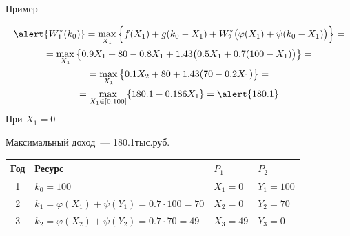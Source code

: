 \documentclass[unicode,11pt,notheorems,xcolor=table]{beamer}
\begin{document}
\begin{frame}[allowframebreaks]{Пример}
\begin{itemize}
\begin{multline*}
	\alert{W^*_1(k_{0})} = \max_{X_1} \Big\{f(X_1)+g(k_{0}-X_1) + W^*_{2} \big(\varphi(X_1)+\psi(k_{0}-X_{1})\big)\Big\}
	=\\
	=\max_{X_1} \big\{0.9X_1+80-0.8X_1 + 1.43 \big(0.5X_1+0.7(100-X_{1})\big)\big\}	
	=\\
	=\max_{X_1} \big\{0.1X_2 + 80 + 1.43(70-0.2X_{1})\big\}	
	=\\
	=\max_{X_1\in[0,100]} \{180.1-0.186X_1\}	
	= \alert{180.1}
\end{multline*}
При $X_1=0$
\end{itemize}


\alert{Максимальный доход}~--- 180.1\;тыс.\;руб.

\framebreak


\bigskip
\begin{tabular}{clll}
\hline
Год & Ресурс & $P_1$ & $P_2$\\
\hline
1 & $k_0=100$ & $X_1=0$ & $Y_1=100$\\
2 & $k_1= \varphi(X_1)+\psi(Y_1) = 0.7\cdot 100=70$ & $X_2=0$ & $Y_2=70$\\
3 & $k_2= \varphi(X_2)+\psi(Y_2) = 0.7\cdot 70=49$ & $X_3=49$ & $Y_3=0$\\
\hline
\end{tabular}
\end{frame}
\end{document}

